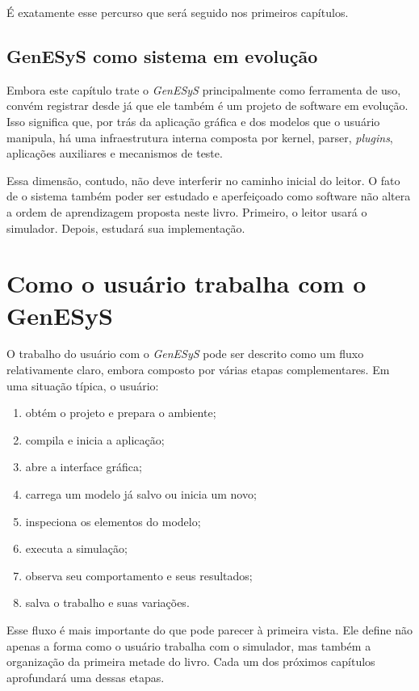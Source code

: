 É exatamente esse percurso que será seguido nos primeiros capítulos.

\subsection{GenESyS como sistema em evolução}
\label{subsec:cap1_genesys_sistema_evolucao}

Embora este capítulo trate o \textit{GenESyS} principalmente como ferramenta de uso, convém registrar desde já que ele também é um projeto de software em evolução. Isso significa que, por trás da aplicação gráfica e dos modelos que o usuário manipula, há uma infraestrutura interna composta por kernel, parser, \textit{plugins}, aplicações auxiliares e mecanismos de teste.

Essa dimensão, contudo, não deve interferir no caminho inicial do leitor. O fato de o sistema também poder ser estudado e aperfeiçoado como software não altera a ordem de aprendizagem proposta neste livro. Primeiro, o leitor usará o simulador. Depois, estudará sua implementação.

\section{Como o usuário trabalha com o GenESyS}
\label{sec:cap1_como_usuario_trabalha}

O trabalho do usuário com o \textit{GenESyS} pode ser descrito como um fluxo relativamente claro, embora composto por várias etapas complementares. Em uma situação típica, o usuário:

\begin{enumerate}
    \item obtém o projeto e prepara o ambiente;
    \item compila e inicia a aplicação;
    \item abre a interface gráfica;
    \item carrega um modelo já salvo ou inicia um novo;
    \item inspeciona os elementos do modelo;
    \item executa a simulação;
    \item observa seu comportamento e seus resultados;
    \item salva o trabalho e suas variações.
\end{enumerate}

Esse fluxo é mais importante do que pode parecer à primeira vista. Ele define não apenas a forma como o usuário trabalha com o simulador, mas também a organização da primeira metade do livro. Cada um dos próximos capítulos aprofundará uma dessas etapas.

